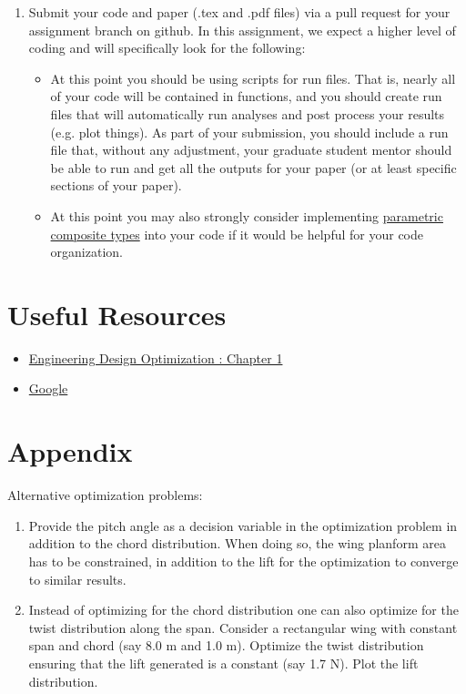\documentclass[12pt]{article}
\begin{document}
\begin{enumerate}
	\item Submit your code and paper (.tex and .pdf files) via a pull request for your assignment branch on github. In this assignment, we expect a higher level of coding and will specifically look for the following: 
	\begin{itemize}
		\item At this point you should be using scripts for run files.  That is, nearly all of your code will be contained in functions, and you should create run files that will automatically run analyses and post process your results (e.g. plot things).  As part of your submission, you should include a run file that, without any adjustment, your graduate student mentor should be able to run and get all the outputs for your paper (or at least specific sections of your paper).
		\item At this point you may also strongly consider implementing \href{https://docs.julialang.org/en/v1/manual/types/#Composite-Types}{parametric composite types} into your code if it would be helpful for your code organization. 
	\end{itemize}
\end{enumerate}



\section{Useful Resources}
\begin{itemize}
	\item \href{http://flowlab.groups.et.byu.net/mdobook.pdf}{Engineering Design Optimization : Chapter 1}
	\item \href{https://www.google.com/}{Google}
\end{itemize}

\section{Appendix}
Alternative optimization problems:
\begin{enumerate}
	\item Provide the pitch angle as a decision variable in the optimization problem in addition to the chord distribution. When doing so, the wing planform area has to be constrained, in addition to the lift for the optimization to converge to similar results.
	
	\item Instead of optimizing for the chord distribution one can also optimize for the twist distribution along the span. Consider a rectangular wing with constant span and chord (say 8.0 m and 1.0 m). Optimize the twist distribution ensuring that the lift generated is a constant (say 1.7 N). Plot the lift distribution.
\end{enumerate}
\end{document}
